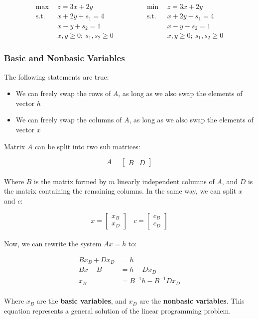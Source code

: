\documentclass{article}
\begin{document}
\begin{equation*}
  \begin{split}
  	\max~~ & z = 3x+2y \\
	\text{s.t.}~~ & x+2y+s_1 = 4 \\
	~~& x-y+s_2 = 1 \\
	~~& x,y \geq 0;~ s_1, s_2 \geq 0
  \end{split}
\quad\quad\quad\quad
  \begin{split}
    \min~~ & z = 3x+2y \\
	\text{s.t.}~~ & x+2y-s_1 = 4 \\
	~~& x-y-s_2 = 1 \\
	~~& x,y \geq 0;~ s_1, s_2 \geq 0
  \end{split}
\end{equation*}

\subsubsection{Basic and Nonbasic Variables}
The following statements are true:

\begin{itemize}
	\item We can freely swap the rows of $A$, as long as we also swap the elements of vector $h$
	\item We can freely swap the columns of $A$, as long as we also swap the elements of vector $x$
\end{itemize}
Matrix $A$ can be split into two sub matrices:

\[ A = \begin{bmatrix} B & D \end{bmatrix} \] \\
Where $B$ is the matrix formed by $m$ linearly independent columns of $A$, and $D$ is the matrix containing the remaining columns. In the same way, we can split $x$ and $c$:

\[ x = \begin{bmatrix} x_B \\ x_D \end{bmatrix} ~~~~ c = \begin{bmatrix} c_B \\ c_D \end{bmatrix} \] \\
Now, we can rewrite the system $Ax = h$ to:

\begin{align*}
	Bx_B + Dx_D &= h \\
	Bx-B &= h - Dx_D \\
	x_B &= B^{-1}h - B^{-1}Dx_D
\end{align*} \\
Where $x_B$ are the \textbf{basic variables}, and $x_D$ are the \textbf{nonbasic variables}. This equation represents a general solution of the linear programming problem.
\end{document}
